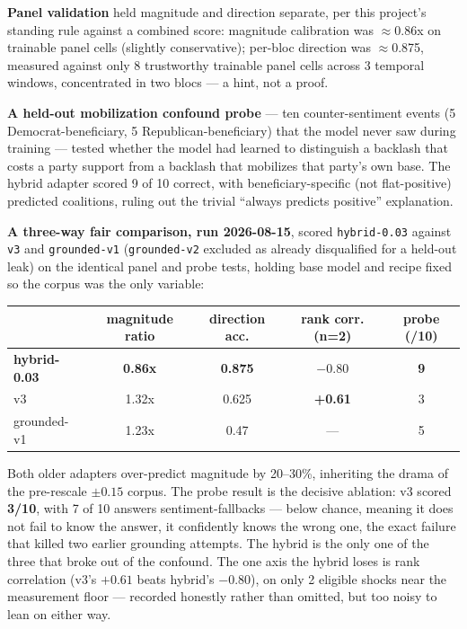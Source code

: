 \documentclass[11pt]{article}
\begin{document}
\textbf{Panel validation} held magnitude and direction separate, per this project's
standing rule against a combined score: magnitude calibration was $\approx$0.86x on
trainable panel cells (slightly conservative); per-bloc direction was $\approx$0.875,
measured against only 8 trustworthy trainable panel cells across 3 temporal windows,
concentrated in two blocs --- a hint, not a proof.

\textbf{A held-out mobilization confound probe} --- ten counter-sentiment events (5
Democrat-beneficiary, 5 Republican-beneficiary) that the model never saw during
training --- tested whether the model had learned to distinguish a backlash that costs
a party support from a backlash that mobilizes that party's own base. The hybrid
adapter scored 9 of 10 correct, with beneficiary-specific (not flat-positive) predicted
coalitions, ruling out the trivial ``always predicts positive'' explanation.

\textbf{A three-way fair comparison, run 2026-08-15}, scored \texttt{hybrid-0.03}
against \texttt{v3} and \texttt{grounded-v1} (\texttt{grounded-v2} excluded as already
disqualified for a held-out leak) on the identical panel and probe tests, holding base
model and recipe fixed so the corpus was the only variable:

\begin{center}
\begin{tabular}{lcccc}
\toprule
 & magnitude ratio & direction acc. & rank corr. (n=2) & probe (/10) \\
\midrule
\textbf{hybrid-0.03} & \textbf{0.86x} & \textbf{0.875} & $-0.80$ & \textbf{9} \\
v3 & 1.32x & 0.625 & \textbf{+0.61} & 3 \\
grounded-v1 & 1.23x & 0.47 & --- & 5 \\
\bottomrule
\end{tabular}
\end{center}

Both older adapters over-predict magnitude by 20--30\%, inheriting the drama of the
pre-rescale $\pm0.15$ corpus. The probe result is the decisive ablation: v3 scored
\textbf{3/10}, with 7 of 10 answers sentiment-fallbacks --- below chance, meaning it
does not fail to know the answer, it confidently knows the wrong one, the exact failure
that killed two earlier grounding attempts. The hybrid is the only one of the three
that broke out of the confound. The one axis the hybrid loses is rank correlation
(v3's $+0.61$ beats hybrid's $-0.80$), on only 2 eligible shocks near the measurement
floor --- recorded honestly rather than omitted, but too noisy to lean on either way.
\end{document}
